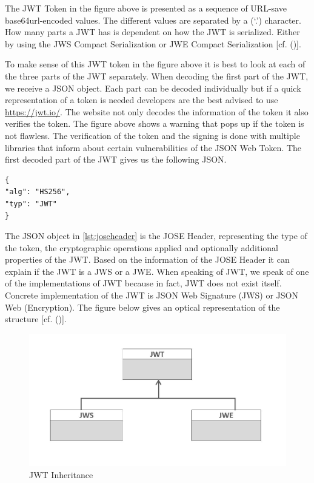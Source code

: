 The JWT Token in the figure above is presented as a sequence of URL-save base64url-encoded values. The different values are separated by a (‘.’) character. How many parts a JWT has is dependent on how the JWT is serialized. Either by using the JWS Compact Serialization or JWE Compact Serialization  [cf. (\cite{JWT:IETF:Jones:2015})].


To make sense of this JWT token in the figure above it is best to look at each of the three parts of the JWT separately. When decoding the first part of the JWT, we receive a JSON object. Each part can be decoded individually but if a quick representation of a token is needed developers are the best advised to use \href{https://jwt.io/} {https://jwt.io/}. The website not only decodes the information of the token it also verifies the token. The figure above shows a warning that pops up if the token is not flawless. The verification of the token and the signing is done with multiple libraries that inform about certain vulnerabilities of the JSON Web Token. The first decoded part of the JWT gives us the following JSON.


\begin{lstlisting}
{
"alg": "HS256",
"typ": "JWT"
}
\end{lstlisting}


The JSON object in \ref{lst:joseheader} is the JOSE Header, representing the type of the token, the cryptographic operations applied and optionally additional properties of the JWT. Based on the information of the JOSE Header it can explain if the JWT is a JWS or a JWE. When speaking of JWT, we speak of one of the implementations of JWT because in fact, JWT does not exist itself. Concrete implementation of the JWT is JSON Web Signature (JWS) or JSON Web (Encryption). The figure below gives an optical representation of the structure [cf. (\cite{Siriwardena:JWTJWSJWE:2016})].

\begin{figure}[h]
	\centering
	\includegraphics[width=0.8\linewidth]{images/jwtjwsjwe2}
	\caption{JWT Inheritance}
	\label{fig:jwtjwsjwe2}
\end{figure}


